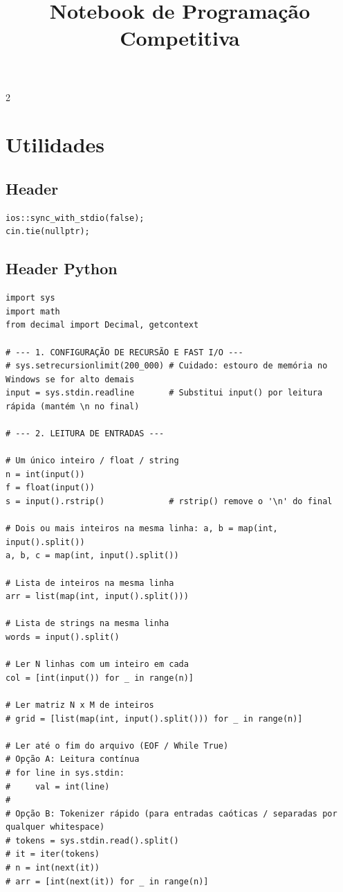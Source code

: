 \documentclass[11pt]{article}
\title{\textbf{Notebook de Programação Competitiva}}
\author{}
\date{}
\begin{document}
\maketitle

\begin{multicols}{2}

\tableofcontents
\newpage

\section{Utilidades}

\subsection{Header}
\begin{lstlisting}
ios::sync_with_stdio(false);
cin.tie(nullptr);
\end{lstlisting}

\subsection{Header Python}
\begin{lstlisting}
import sys
import math
from decimal import Decimal, getcontext

# --- 1. CONFIGURAÇÃO DE RECURSÃO E FAST I/O ---
# sys.setrecursionlimit(200_000) # Cuidado: estouro de memória no Windows se for alto demais
input = sys.stdin.readline       # Substitui input() por leitura rápida (mantém \n no final)

# --- 2. LEITURA DE ENTRADAS ---

# Um único inteiro / float / string
n = int(input())
f = float(input())
s = input().rstrip()             # rstrip() remove o '\n' do final

# Dois ou mais inteiros na mesma linha: a, b = map(int, input().split())
a, b, c = map(int, input().split())

# Lista de inteiros na mesma linha
arr = list(map(int, input().split()))

# Lista de strings na mesma linha
words = input().split()

# Ler N linhas com um inteiro em cada
col = [int(input()) for _ in range(n)]

# Ler matriz N x M de inteiros
# grid = [list(map(int, input().split())) for _ in range(n)]

# Ler até o fim do arquivo (EOF / While True)
# Opção A: Leitura contínua
# for line in sys.stdin:
#     val = int(line)
#
# Opção B: Tokenizer rápido (para entradas caóticas / separadas por qualquer whitespace)
# tokens = sys.stdin.read().split()
# it = iter(tokens)
# n = int(next(it))
# arr = [int(next(it)) for _ in range(n)]


\end{lstlisting}
\end{multicols}
\end{document}
